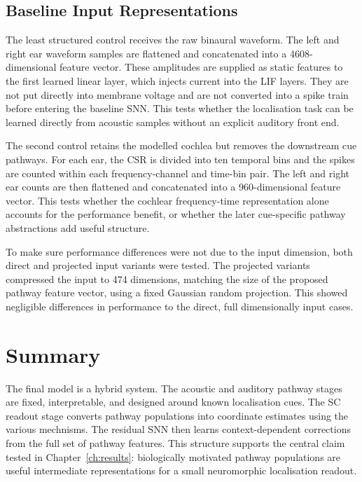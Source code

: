 \subsection{Baseline Input Representations}

The least structured control receives the raw binaural waveform. The left and right ear waveform samples are flattened and concatenated into a 4608-dimensional feature vector. These amplitudes are supplied as static features to the first learned linear layer, which injects current into the LIF layers. They are not put directly into membrane voltage and are not converted into a spike train before entering the baseline SNN. This tests whether the localisation task can be learned directly from acoustic samples without an explicit auditory front end.

The second control retains the modelled cochlea but removes the downstream cue pathways. For each ear, the CSR is divided into ten temporal bins and the spikes are counted within each frequency-channel and time-bin pair. The left and right ear counts are then flattened and concatenated into a 960-dimensional feature vector. This tests whether the cochlear frequency-time representation alone accounts for the performance benefit, or whether the later cue-specific pathway abstractions add useful structure.

To make sure performance differences were not due to the input dimension, both direct and projected input variants were tested. The projected variants compressed the input to 474 dimensions, matching the size of the proposed pathway feature vector, using a fixed Gaussian random projection. This showed negligible differences in performance to the direct, full dimensionally input cases.

\section{Summary}

The final model is a hybrid system. The acoustic and auditory pathway stages are fixed, interpretable, and designed around known localisation cues. The SC readout stage converts pathway populations into coordinate estimates using the various mechnisms. The residual SNN then learns context-dependent corrections from the full set of pathway features. This structure supports the central claim tested in Chapter~\ref{ch:results}: biologically motivated pathway populations are useful intermediate representations for a small neuromorphic localisation readout.
